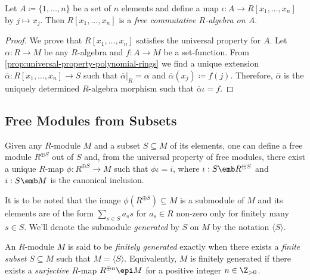 \begin{proposition}
\label{prop:ring-poly-is-free-commutative-R-algebra}
Let \(A \coloneq \{1, \dots, n\}\) be a set of \(n\) elements and define a map
\(\iota: A \to R[x_1, \dots, x_n]\) by \(j \mapsto x_j\). Then \(R[x_1, \dots,
x_n]\) is a \emph{free commutative \(R\)-algebra on \(A\)}.
\end{proposition}

\begin{proof}
We prove that \(R[x_1, \dots, x_n]\) satisfies the universal property for
\(A\). Let \(\alpha: R \to M\) be any \(R\)-algebra and \(f: A \to M\) be a
set-function. From \cref{prop:universal-property-polynomial-rings} we find a
unique extension \(\overline{\alpha}: R[x_1, \dots, x_n] \to S\) such that
\(\overline{\alpha}|_R = \alpha\) and \(\overline{\alpha}(x_j) \coloneq
f(j)\). Therefore, \(\overline{\alpha}\) is the uniquely determined
\(R\)-algebra morphism such that \(\overline{\alpha} \iota = f\).
\end{proof}

\subsection{Free Modules from Subsets}

Given any \(R\)-module \(M\) and a subset \(S \subseteq M\) of its elements, one
can define a free module \(R^{\oplus S}\) out of \(S\) and, from the universal
property of free modules, there exist a unique \(R\)-map \(\phi: R^{\oplus S}
\to M\) such that \(\phi \iota = i\), where \(\iota: S \emb R^{\oplus S}\) and
\(i: S \emb M\) is the canonical inclusion.

It is to be noted that the image \(\phi(R^{\oplus S}) \subseteq M\) is a
submodule of \(M\) and its elements are of the form \(\sum_{s \in S} a_s s\) for
\(a_s \in R\) non-zero only for finitely many \(s \in S\). We'll denote the
submodule \emph{generated} by \(S\) on \(M\) by the notation
\(\langle S \rangle\).


\begin{definition}
\label{def:finitely-generated-module}
An \(R\)-module \(M\) is said to be \emph{finitely generated} exactly when there
exists a \emph{finite subset} \(S \subseteq M\) such that
\(M = \langle S \rangle\). Equivalently, \(M\) is finitely generated if there
exists a \emph{surjective} \(R\)-map \(R^{\oplus n} \epi M\) for a positive
integer \(n \in \Z_{>0}\).
\end{definition}

